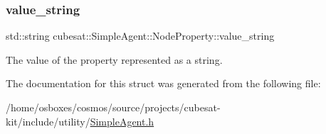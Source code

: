 \subsubsection{\texorpdfstring{value\+\_\+string}{value\_string}}
{\footnotesize\ttfamily std\+::string cubesat\+::\+Simple\+Agent\+::\+Node\+Property\+::value\+\_\+string}



The value of the property represented as a string. 



The documentation for this struct was generated from the following file\+:\begin{DoxyCompactItemize}
\item 
/home/osboxes/cosmos/source/projects/cubesat-\/kit/include/utility/\hyperlink{SimpleAgent_8h}{Simple\+Agent.\+h}\end{DoxyCompactItemize}
